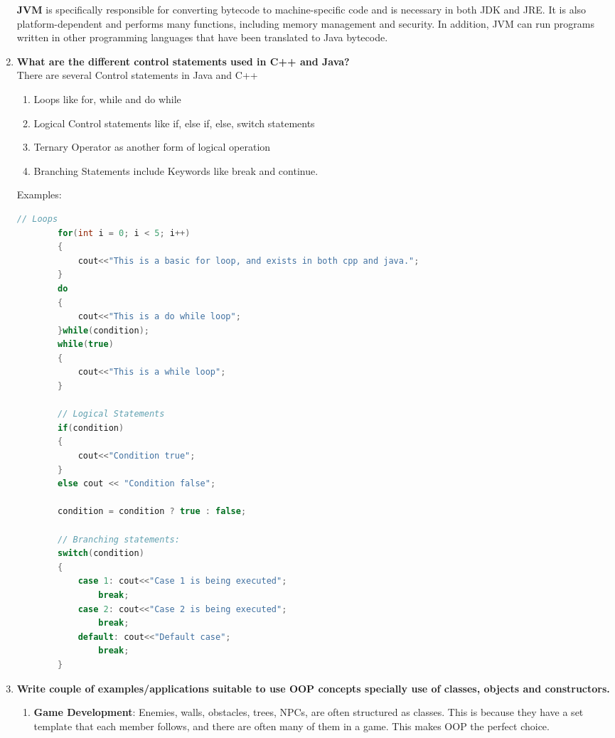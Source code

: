 \documentclass[11pt]{article}
\begin{document}
\begin{enumerate}
	\textbf{JVM} is specifically responsible for converting bytecode to machine-specific code and is necessary in both JDK and JRE. It is also platform-dependent and performs many functions, including memory management and security. In addition, JVM can run programs written in other programming languages that have been translated to Java bytecode.

	\item \textbf{What are the different control statements used in C++ and Java?}\\
	There are several Control statements in Java and C++
	\begin{enumerate}
		\item Loops like for, while and do while
		\item Logical Control statements like if, else if, else, switch statements
		\item Ternary Operator as another form of logical operation
		\item Branching Statements include Keywords like break and continue.
	\end{enumerate}

	Examples: 
	\begin{lstlisting}[language=C++]
		// Loops
		for(int i = 0; i < 5; i++)
		{
			cout<<"This is a basic for loop, and exists in both cpp and java.";
		}
		do
		{
			cout<<"This is a do while loop";
		}while(condition);
		while(true)
		{
			cout<<"This is a while loop";
		}

		// Logical Statements
		if(condition)
		{
			cout<<"Condition true";
		}
		else cout << "Condition false";

		condition = condition ? true : false;

		// Branching statements: 
		switch(condition)
		{
			case 1: cout<<"Case 1 is being executed";
				break;
			case 2: cout<<"Case 2 is being executed";
				break;
			default: cout<<"Default case";
				break;
		}
	\end{lstlisting}
	\item \textbf{Write couple of examples/applications suitable to use OOP concepts specially use
	of classes, objects and constructors.}\\
	\begin{enumerate}
		\item \textbf{Game Development}: Enemies, walls, obstacles, trees, NPCs, are often structured as classes. This is because they have a set template that each member follows, and there are often many of them in a game. This makes OOP the perfect choice. 
		

\end{enumerate}
\end{enumerate}
\end{document}
